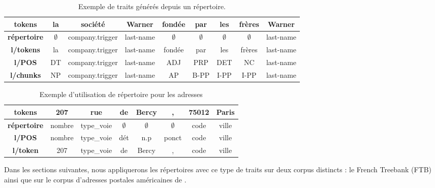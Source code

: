 \documentclass[PhD-Yoann-Dupont.tex]{subfiles}
\begin{document}
\begin{table}[ht!]
\centering
\begin{tabular}{|c|cccccccc|}
\hline
\textbf{tokens}      & la          & société         & Warner    & fondée      & par         & les         & frères      & Warner \\
\hline
\textbf{répertoire} & $\emptyset$ & company.trigger & last-name & $\emptyset$ & $\emptyset$ & $\emptyset$ & $\emptyset$ & last-name \\
\textbf{l/tokens}    & la          & company.trigger & last-name & fondée      & par         & les         & frères      & last-name \\
\textbf{l/POS}     & DT          & company.trigger & last-name & ADJ         & PRP         & DET         & NC          & last-name \\
\textbf{l/chunks}  & NP          & company.trigger & last-name & AP          & B-PP        & I-PP        & I-PP        & last-name \\
\hline
\end{tabular}
\caption{Exemple de traits générés depuis un répertoire.}
\label{tab:ontology-company-vs-person}
\end{table}

\begin{table}[ht!]
\centering
\begin{tabular}{|c|ccccccc|}
\hline
\textbf{tokens}      & 207    & rue        & de          & Bercy       & ,           & 75012 & Paris \\
\hline
\textbf{répertoire} & nombre & type\_voie & $\emptyset$ & $\emptyset$ & $\emptyset$ & code  & ville \\
\textbf{l/POS}     & nombre & type\_voie & dét         & n.p         & ponct       & code  & ville \\
\textbf{l/token}     & 207    & type\_voie & de          & Bercy       & ,           & code  & ville \\
\hline
\end{tabular}
\caption{Exemple d'utilisation de répertoire pour les adresses}
\label{tab:taxonomy-address-example}
\end{table}

Dans les sections suivantes, nous appliquerons les répertoires avec ce type de traits sur deux corpus distincts : le French Treebank (FTB) ainsi que sur le corpus d'adresses postales américaines de \citet{yu2007high}.
\end{document}
